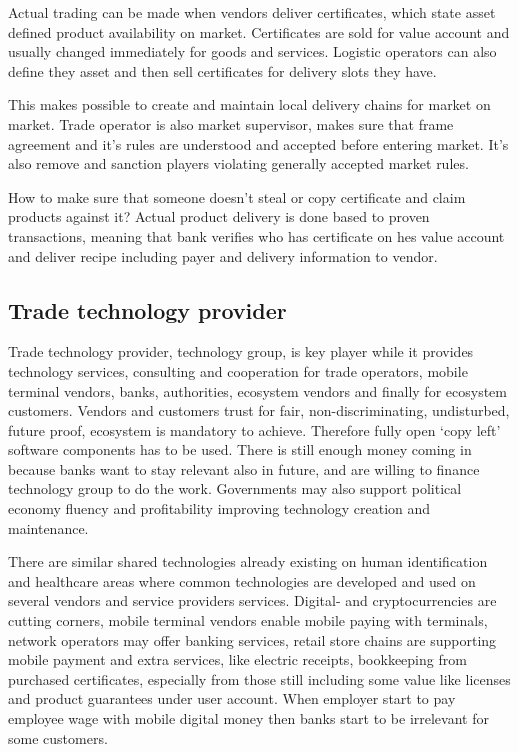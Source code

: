 Actual trading can be made when vendors deliver certificates, which state
asset defined product availability on market. Certificates are sold for value
account and usually changed immediately for goods and services. Logistic
operators can also define they asset and then sell certificates for delivery
slots they have.

This makes possible to create and maintain local delivery chains for market on
market. Trade operator is also market supervisor, makes sure that frame
agreement and it's rules are understood and accepted before entering market.
It's also remove and sanction players violating generally accepted market
rules.

How to make sure that someone doesn't steal or copy certificate and claim
products against it? Actual product delivery is done based to proven
transactions, meaning that bank verifies who has certificate on hes value
account and deliver recipe including payer and delivery information to vendor.

\subsection{Trade technology provider}
\label{tehnology_provider}
Trade technology provider, technology group, is key player while it provides
technology services, consulting and cooperation for trade operators, mobile
terminal vendors, banks, authorities, ecosystem vendors and finally for
ecosystem customers. Vendors and customers trust for fair, non-discriminating,
undisturbed, future proof, ecosystem is mandatory to achieve. Therefore fully
open `copy left' software components has to be
used\allowbreak\cite{OpenLogisticsFoundation}. There is still enough
money coming in because banks want to stay relevant also in future, and are
willing to finance technology group to do the work. Governments may also
support political economy fluency and profitability improving technology
creation and maintenance.

There are similar shared technologies already existing on human identification
and healthcare areas where common technologies are developed and used on
several vendors and service providers services. Digital- and cryptocurrencies
are cutting corners, mobile terminal vendors enable mobile paying with
terminals, network operators may offer banking services, retail store chains
are supporting mobile payment and extra services, like electric receipts,
bookkeeping from purchased certificates, especially from those still including
some value like licenses and product guarantees under user account. When
employer start to pay employee wage with mobile digital money then banks start
to be irrelevant for some customers.

